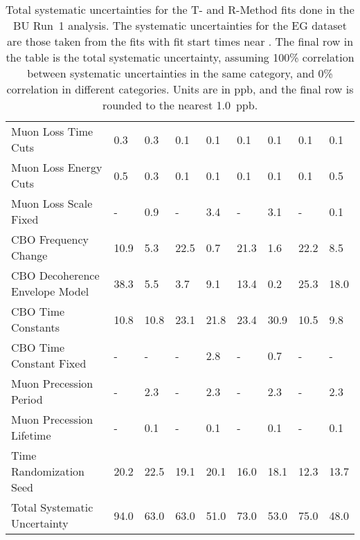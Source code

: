 \begin{landscape}
\begin{table}
\begin{tabular*}{0.8\linewidth}{@{\extracolsep{\fill}}lHHHHHHHH}
    Muon Loss Time Cuts      &  0.3  &  0.3 &  0.1 &  0.1 &  0.1 &  0.1 &  0.1 &  0.1 \\
    Muon Loss Energy Cuts    &  0.5  &  0.3 &  0.1 &  0.1 &  0.1 &  0.1 &  0.1 &  0.5 \\
    Muon Loss Scale Fixed    &  -	   &  0.9 &  -	 &  3.4 &  -   &  3.1 &  -	 &  0.1 \\
  \hdashline
    CBO Frequency Change      		   &  10.9 &  5.3 & 22.5 &  0.7 & 21.3 &  1.6 & 22.2 &  8.5 \\
    CBO Decoherence Envelope Model   &  38.3 &  5.5 &  3.7 &  9.1 & 13.4 &  0.2 & 25.3 & 18.0 \\
    CBO Time Constants      		     &  10.8 & 10.8 & 23.1 & 21.8 & 23.4 & 30.9 & 10.5 &  9.8 \\
    CBO Time Constant Fixed      	   &  -    & -    & -	 &  2.8 & -	   &  0.7 & -	 & - \\
  \hdashline
    Muon Precession Period      	   &  -	   &  2.3 & -	 & 2.3  & -	   &  2.3 & -	 &  2.3 \\
    Muon Precession Lifetime      	 &  -	   &  0.1 & -	 & 0.1  & -	   &  0.1 & -	 &  0.1 \\
  \hdashline
    Time Randomization Seed      	   &  20.2 & 22.5 & 19.1 & 20.1 & 16.0 & 18.1 & 12.3 & 13.7 \\
  \hline
    Total Systematic Uncertainty & 94.0 & 63.0 & 63.0 & 51.0 & 73.0 & 53.0 & 75.0 & 48.0 \\
  \hline 
\end{tabular*}
\caption[]{Total systematic uncertainties for the T- and R-Method fits done in the BU Run~1 \wa analysis. The systematic uncertainties for the EG dataset are those taken from the fits with fit start times near . The final row in the table is the total systematic uncertainty, assuming 100\% correlation between systematic uncertainties in the same category, and 0\% correlation in different categories. Units are in ppb, and the final row is rounded to the nearest 1.0~ppb.}
\label{tab:totalErrs}
\end{table}
\end{landscape}







